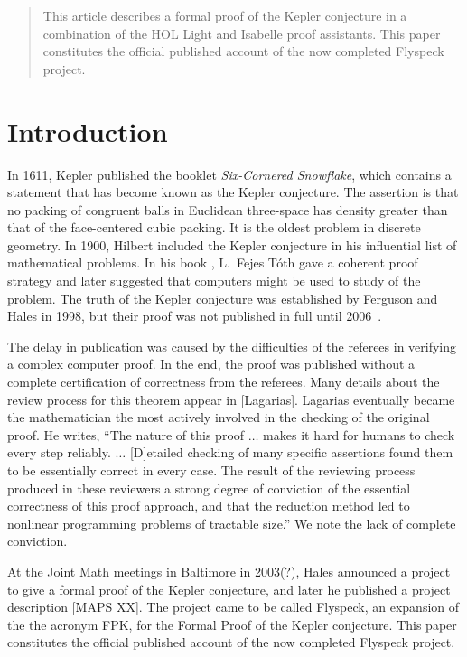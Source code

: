 \begin{abstract}
This article describes a formal proof of the Kepler conjecture in a combination of the HOL Light and Isabelle proof
assistants.
This paper constitutes the official published account of the now completed Flyspeck project.
\end{abstract}


\section{Introduction}


In 1611, Kepler published the booklet {\it Six-Cornered Snowflake}, which contains a statement that has
become  known as the Kepler conjecture.  The assertion is that no packing of congruent balls in Euclidean three-space has
density greater than that of the face-centered cubic packing.  It is the oldest problem in discrete geometry.
In 1900, Hilbert included the Kepler conjecture in his influential list of mathematical problems.  In his book \cite{XX},
L.\ Fejes T\'oth 
gave a coherent proof strategy and later suggested that computers might be used to study of the problem.
The truth of the Kepler conjecture was established 
by Ferguson and Hales in 1998, but their proof was not published in full until 2006~\cite{DCG}.

The delay in publication was caused by the difficulties of the referees in  verifying a complex computer proof.
In the end, the proof was published without a complete certification of correctness from the referees.  Many details about the
review process for this theorem appear in [Lagarias].  Lagarias eventually became the mathematician the most actively
involved in the checking of the original proof.  He  writes, ``The nature of this proof $\ldots$ makes it hard for
humans to check every step reliably. $\ldots$  [D]etailed checking of many specific assertions found them
to be essentially correct in every case.  The result of the reviewing process produced in these reviewers a 
strong degree of conviction of the essential correctness of this proof approach, and that the reduction method
led to nonlinear programming problems of tractable size.''   We note the lack of complete conviction.

At the Joint Math meetings in Baltimore in
2003(?), Hales announced
a project to give a formal proof of the Kepler conjecture,
and later he published a project description [MAPS XX].
The project came to be called Flyspeck, an expansion of the the acronym FPK, for the Formal Proof of the Kepler conjecture.
This paper constitutes the official published account of the now completed Flyspeck project.


